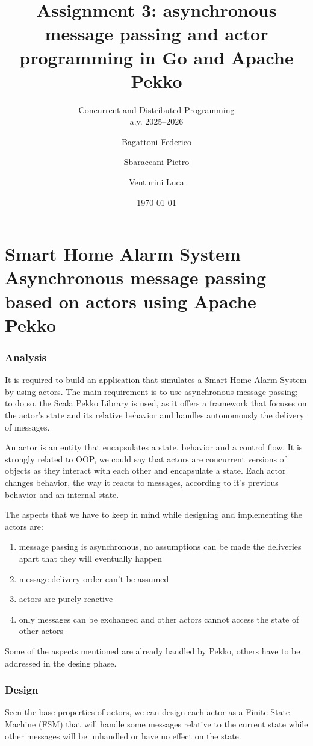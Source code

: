 \documentclass{scrartcl}
\title{\LARGE Assignment 3: asynchronous message passing and actor programming in Go and Apache Pekko}
\subtitle{Concurrent and Distributed Programming\\a.y. 2025--2026}
\author{
  Bagattoni Federico \and Sbaraccani Pietro \and Venturini Luca
}
\date{\today}
\begin{document}

\maketitle

\tableofcontents

\clearpage
\part[Smart Home Alarm System]{Smart Home Alarm System \\ \LARGE{Asynchronous message passing based on actors using Apache Pekko}}

\section{Analysis}
It is required to build an application that simulates a Smart Home Alarm System by using actors. The main requirement is to use 
asynchronous message passing; to do so, the Scala Pekko Library is used, as it offers a framework that focuses on the actor's state
and its relative behavior and handles autonomously the delivery of messages.

An actor is an entity that encapsulates a state, behavior and a control flow. It is strongly related to OOP, we could say that actors
are concurrent versions of objects as they interact with each other and encapsulate a state. 
Each actor changes behavior, the way it reacts to messages, according to it's previous behavior and an internal state.

The aspects that we have to keep in mind while designing and implementing the actors are:
\begin{enumerate}
  \item message passing is asynchronous, no assumptions can be made the deliveries apart that they will eventually happen
  \item message delivery order can't be assumed
  \item actors are purely reactive
  \item only messages can be exchanged and other actors cannot access the state of other actors
\end{enumerate}

Some of the aspects mentioned are already handled by Pekko, others have to be addressed in the desing phase.

\section{Design}
Seen the base properties of actors, we can design each actor as a Finite State Machine (FSM) that will handle some messages relative to the 
current state while other messages will be unhandled or have no effect on the state.
\end{document}
